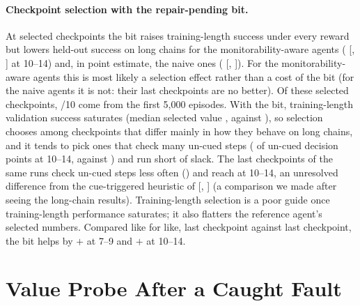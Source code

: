 \paragraph{Checkpoint selection with the repair-pending bit.}
At selected checkpoints the bit raises training-length success under every reward but lowers held-out success on long chains for the monitorability-aware agents ( [, ] at 10--14) and, in point estimate, the naive ones ( [, ]). For the monitorability-aware agents this is most likely a selection effect rather than a cost of the bit (for the naive agents it is not: their last checkpoints are no better). Of these selected checkpoints, /10 come from the first 5{,}000 episodes. With the bit, training-length validation success saturates (median selected value , against ), so selection chooses among checkpoints that differ mainly in how they behave on long chains, and it tends to pick ones that check many un-cued steps ( of un-cued decision points at 10--14, against ) and run short of slack. The last checkpoints of the same runs check un-cued steps less often () and reach  at 10--14, an unresolved difference from the cue-triggered heuristic of  [, ] (a comparison we made after seeing the long-chain results). Training-length selection is a poor guide once training-length performance saturates; it also flatters the reference agent's selected numbers. Compared like for like, last checkpoint against last checkpoint, the bit helps by $+$ at 7--9 and $+$ at 10--14.

\section{Value Probe After a Caught Fault}
\label{app:probe}


